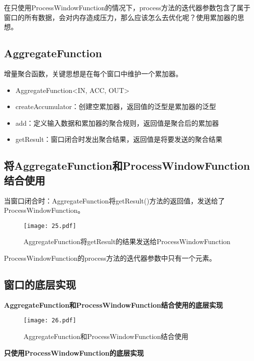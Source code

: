 \documentclass[cn,11pt,chinese]{elegantbook}
\begin{document}
\begin{tcolorbox}
  在只使用ProcessWindowFunction的情况下，process方法的迭代器参数包含了属于窗口的所有数据，会对内存造成压力，那么应该怎么去优化呢？使用累加器的思想。
\end{tcolorbox}

\subsection{AggregateFunction}

增量聚合函数，关键思想是在每个窗口中维护一个累加器。

\begin{itemize}
  \item AggregateFunction<IN, ACC, OUT>
  \item createAccumulator：创建空累加器，返回值的泛型是累加器的泛型
  \item add：定义输入数据和累加器的聚合规则，返回值是聚合后的累加器
  \item getResult：窗口闭合时发出聚合结果，返回值是将要发送的聚合结果
\end{itemize}

\subsection{将AggregateFunction和ProcessWindowFunction结合使用}

当窗口闭合时：AggregateFunction将getResult()方法的返回值，发送给了ProcessWindowFunction。

\begin{figure}[htbp]
  \centering
  \texttt{[image: 25.pdf]}
  \caption{AggregateFunction将getResult的结果发送给ProcessWindowFunction}
\end{figure}

ProcessWindowFunction的process方法的迭代器参数中只有一个元素。

\subsection{窗口的底层实现}

\textbf{AggregateFunction和ProcessWindowFunction结合使用的底层实现}

\begin{figure}[htbp]
  \centering
  \texttt{[image: 26.pdf]}
  \caption{AggregateFunction和ProcessWindowFunction结合使用}
\end{figure}

\textbf{只使用ProcessWindowFunction的底层实现}
\end{document}
